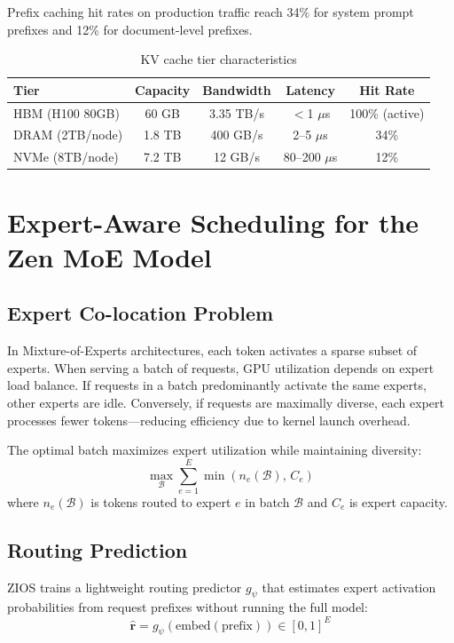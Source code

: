 \documentclass[11pt,a4paper]{article}
\begin{document}
Prefix caching hit rates on production traffic reach 34\% for system prompt prefixes and 12\% for document-level prefixes.

\begin{table}[H]
\centering
\caption{KV cache tier characteristics}
\label{tab:kv_tiers}
\begin{tabular}{lcccc}
\toprule
Tier & Capacity & Bandwidth & Latency & Hit Rate \\
\midrule
HBM (H100 80GB) & 60 GB & 3.35 TB/s & $<$1 $\mu$s & 100\% (active) \\
DRAM (2TB/node) & 1.8 TB & 400 GB/s & 2--5 $\mu$s & 34\% \\
NVMe (8TB/node) & 7.2 TB & 12 GB/s & 80--200 $\mu$s & 12\% \\
\bottomrule
\end{tabular}
\end{table}

\section{Expert-Aware Scheduling for the Zen MoE Model}

\subsection{Expert Co-location Problem}

In Mixture-of-Experts architectures, each token activates a sparse subset of experts. When serving a batch of requests, GPU utilization depends on expert load balance. If requests in a batch predominantly activate the same experts, other experts are idle. Conversely, if requests are maximally diverse, each expert processes fewer tokens—reducing efficiency due to kernel launch overhead.

The optimal batch maximizes expert utilization while maintaining diversity:
\begin{equation}
\max_{\mathcal{B}} \sum_{e=1}^{E} \min\!\left(n_e(\mathcal{B}),\, C_e\right)
\end{equation}
where $n_e(\mathcal{B})$ is tokens routed to expert $e$ in batch $\mathcal{B}$ and $C_e$ is expert capacity.

\subsection{Routing Prediction}

ZIOS trains a lightweight routing predictor $g_\psi$ that estimates expert activation probabilities from request prefixes without running the full model:
\begin{equation}
\hat{\mathbf{r}} = g_\psi(\text{embed}(\text{prefix})) \in [0,1]^E
\end{equation}
\end{document}
